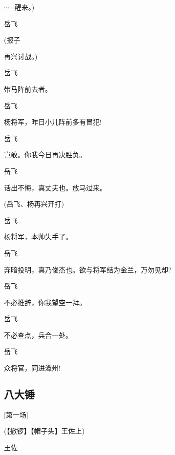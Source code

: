 {{{{$\cdots{}\cdots{}$醒来。)}

{岳飞\hspace{30pt}~

 }

{(报子\hspace{30pt}~

再兴讨战。)}

{岳飞\hspace{30pt}~

带马阵前去者。}

{岳飞\hspace{30pt}~

杨将军，昨日小儿阵前多有冒犯!}

{岳飞\hspace{30pt}~

岂敢。你我今日再决胜负。}

{岳飞\hspace{30pt}~

话出不悔，真丈夫也。放马过来。}

{(岳飞、杨再兴开打)}

{岳飞\hspace{30pt}~

杨将军，本帅失手了。}

{岳飞\hspace{30pt}~

弃暗投明，真乃俊杰也。欲与将军结为金兰，万勿见却?}

{岳飞\hspace{30pt}~

不必推辞，你我望空一拜。}

{岳飞\hspace{30pt}~

不必查点，兵合一处。}

{岳飞\hspace{30pt}~

众将官，同进潭州!}

\newpage

\hypertarget{ux516bux5927ux9524}{%

\subsection{八大锤}\label{ux516bux5927ux9524}}

{{[}第一场{]}}

{(【撤锣】【帽子头】王佐上)}

{王佐\hspace{30pt}~

}}}}
